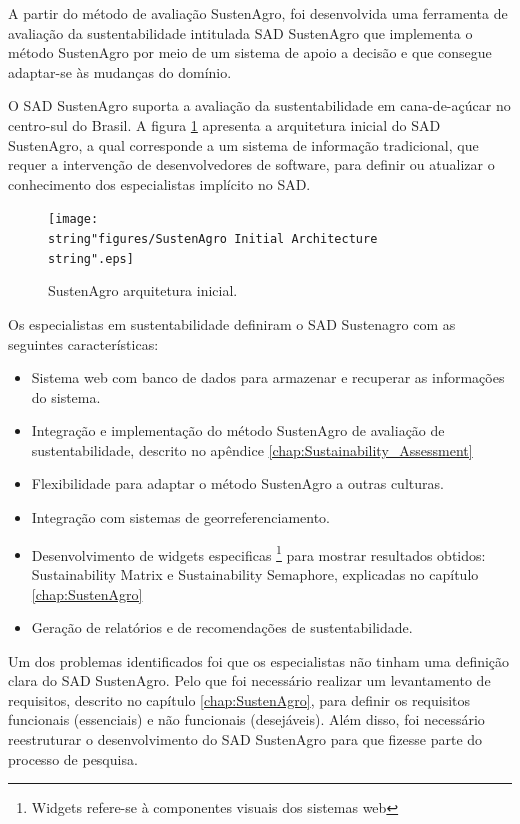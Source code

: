 A partir do método de avaliação SustenAgro, foi desenvolvida uma ferramenta
de avaliação da sustentabilidade intitulada SAD SustenAgro que implementa
o método SustenAgro por meio de um sistema de apoio a decisão e que
consegue adaptar-se às mudanças do domínio.

O SAD SustenAgro suporta a avaliação da sustentabilidade em cana-de-açúcar
no centro-sul do Brasil. A figura \ref{fig:SustenAgro-arquitetura-inicial}
apresenta a arquitetura inicial do SAD SustenAgro, a qual corresponde
a um sistema de informação tradicional, que requer a intervenção de
desenvolvedores de software, para definir ou atualizar o conhecimento
dos especialistas implícito no SAD.

\begin{figure}[h]
\begin{centering}
\texttt{[image: \\string"figures/SustenAgro Initial Architecture\\string".eps]}
\par\end{centering}
\caption{SustenAgro arquitetura inicial.\label{fig:SustenAgro-arquitetura-inicial}}
\end{figure}

Os especialistas em sustentabilidade definiram o SAD Sustenagro com
as seguintes características:
\begin{itemize}
\item Sistema web com banco de dados para armazenar e recuperar as informações
do sistema.
\item Integração e implementação do método SustenAgro de avaliação de sustentabilidade,
descrito no apêndice \ref{chap:Sustainability_Assessment} 
\item Flexibilidade para adaptar o método SustenAgro a outras culturas.
\item Integração com sistemas de georreferenciamento.
\item Desenvolvimento de \foreignlanguage{english}{widgets} especificas
\footnote{%
Widgets\foreignlanguage{brazil}{ refere-se à componentes visuais dos
sistemas web }%
} para mostrar resultados obtidos: \foreignlanguage{english}{Sustainability
Matrix }e \foreignlanguage{english}{Sustainability Semaphore,} explicadas
no capítulo \foreignlanguage{english}{\ref{chap:SustenAgro}}
\item Geração de relatórios e de recomendações de sustentabilidade.
\end{itemize}
Um dos problemas identificados foi que os especialistas não tinham
uma definição clara do SAD SustenAgro. Pelo que foi necessário realizar
um levantamento de requisitos, descrito no capítulo \ref{chap:SustenAgro},
para definir os requisitos funcionais (essenciais) e não funcionais
(desejáveis). Além disso, foi necessário reestruturar o desenvolvimento
do SAD SustenAgro para que fizesse parte do processo de pesquisa.

